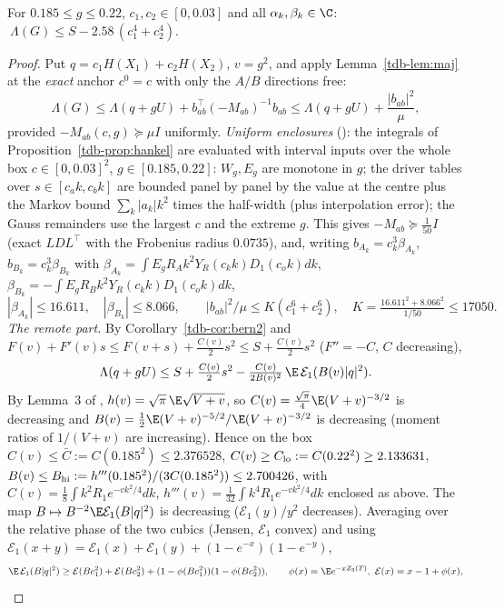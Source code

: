 \begin{theorem}\label{tdb-thm:local}
For $0.185\le g\le0.22$, $c_1,c_2\in[0,0.03]$ and all $\alpha_k,\beta_k\in\C$: $\ \Lambda(G)\le S-2.58\,(c_1^4+c_2^4)$.
\end{theorem}
\begin{proof}
Put $q=c_1H(X_1)+c_2H(X_2)$, $v=g^2$, and apply Lemma~\ref{tdb-lem:maj} at the \emph{exact} anchor $c^0=c$ with only the $A/B$ directions free:
\[
\Lambda(G)\le\Lambda(q+gU)+b_{ab}^\top(-M_{ab})^{-1}b_{ab}\le\Lambda(q+gU)+\frac{|b_{ab}|^2}{\mu},
\]
provided $-M_{ab}(c,g)\succeq\mu I$ uniformly. \emph{Uniform enclosures} (): the integrals of Proposition~\ref{tdb-prop:hankel} are
evaluated with interval inputs over the whole box $c\in[0,0.03]^2$, $g\in[0.185,0.22]$: $W_g,E_g$ are monotone in $g$; the driver tables over
$s\in[c_ak,c_bk]$ are bounded panel by panel by the value at the centre plus the Markov bound $\sum_k|a_k|k^2$ times the half-width (plus
interpolation error); the Gauss remainders use the largest $c$ and the extreme $g$. This gives $-M_{ab}\succeq\frac1{50}I$ (exact $LDL^\top$ with
the Frobenius radius $0.0735$), and, writing $b_{A_k}=c_k^3\beta_{A_k}$, $b_{B_k}=c_k^3\beta_{B_k}$ with
$\beta_{A_k}=\int E_gR_Ak^2Y_R(c_kk)D_1(c_ok)dk$, $\beta_{B_k}=-\int E_gR_Bk^2Y_R(c_kk)D_1(c_ok)dk$,
\[
|\beta_{A_k}|\le16.611,\quad|\beta_{B_k}|\le8.066,\qquad |b_{ab}|^2/\mu\le K(c_1^6+c_2^6),\quad K=\tfrac{16.611^2+8.066^2}{1/50}\le17050 .
\]
\emph{The remote part.} By Corollary~\ref{tdb-cor:bern2} and $F(v)+F'(v)s\le F(v+s)+\frac{C(v)}2s^2\le S+\frac{C(v)}2s^2$ ($F''=-C$, $C$ decreasing),
\[
\Lambda(q+gU)\le S+\tfrac{C(v)}2s^2-\tfrac{C(v)}{2B(v)^2}\,\E\,\mathcal E_1(B(v)|q|^2).
\]
By Lemma~3 of \Sd, $h(v)=\sqrt\pi\,\E\sqrt{V+v}$, so $C(v)=\frac{\sqrt\pi}4\E(V+v)^{-3/2}$ is decreasing and
$B(v)=\frac12\E(V+v)^{-5/2}/\E(V+v)^{-3/2}$ is decreasing (moment ratios of $1/(V+v)$ are increasing). Hence on the box
$C(v)\le\bar C:=C(0.185^2)\le2.376528$, $C(v)\ge C_{\rm lo}:=C(0.22^2)\ge2.133631$, $B(v)\le B_{\rm hi}:=h'''(0.185^2)/(3C(0.185^2))\le2.700426$, with
$C(v)=\frac18\int k^2R_1e^{-vk^2/4}dk$, $h'''(v)=\frac1{32}\int k^4R_1e^{-vk^2/4}dk$ enclosed as above. The map $B\mapsto B^{-2}\E\mathcal E_1(B|q|^2)$
is decreasing ($\mathcal E_1(y)/y^2$ decreases). Averaging over the relative phase of the two cubics (Jensen, $\mathcal E_1$ convex) and using
$\mathcal E_1(x+y)=\mathcal E_1(x)+\mathcal E_1(y)+(1-e^{-x})(1-e^{-y})$,
\[
\E\,\mathcal E_1(B|q|^2)\ge\mathcal E(Bc_1^2)+\mathcal E(Bc_2^2)+(1-\phi(Bc_1^2))(1-\phi(Bc_2^2)),\qquad \phi(x)=\E e^{-xZ_3(T)},\ \mathcal E(x)=x-1+\phi(x),
\]
\end{proof}
